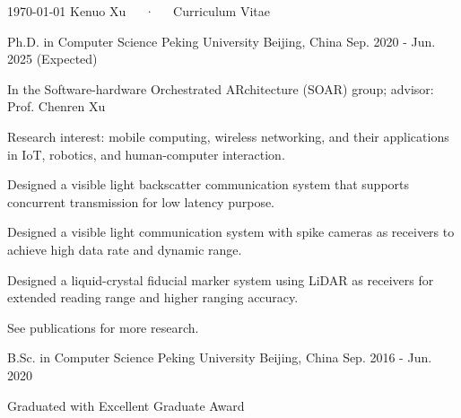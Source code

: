 \documentclass[11pt, a4paper]{awesome-cv}
\begin{document}
\makecvheader

\makecvfooter
  {\today}
  {Kenuo Xu~~~·~~~Curriculum Vitae}
  {\thepage}



\begin{cventries}
	
	\cventry
	{Ph.D. in Computer Science}
	{Peking University}
	{Beijing, China}
	{Sep. 2020 - Jun. 2025 (Expected)}
	{
		\begin{cvitems} %
			\item {In the Software-hardware Orchestrated ARchitecture (SOAR) group; advisor: Prof. Chenren Xu}
			\item {Research interest: mobile computing, wireless networking, and their applications in IoT, robotics, and human-computer interaction.}
			\item {Designed a visible light backscatter communication system that supports concurrent transmission for low latency purpose.}
			\item {Designed a visible light communication system with spike cameras as receivers to achieve high data rate and dynamic range.}
			\item {Designed a liquid-crystal fiducial marker system using LiDAR as receivers for extended reading range and higher ranging accuracy.}
			\item {See publications for more research.}
		\end{cvitems}
	}

	\cventry
	{B.Sc. in Computer Science} %
	{Peking University} %
	{Beijing, China} %
	{Sep. 2016 - Jun. 2020} %
	{
		\begin{cvitems} %
			\item {Graduated with Excellent Graduate Award}
		\end{cvitems}
	}

\end{cventries}
\end{document}
